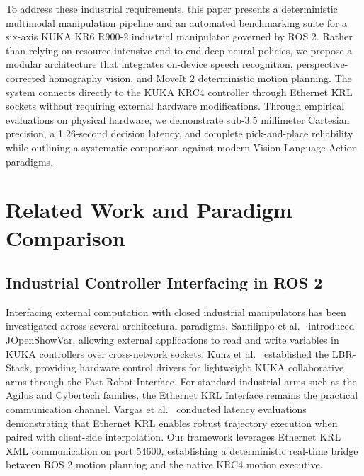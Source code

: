 \documentclass[runningheads]{llncs}
\begin{document}
To address these industrial requirements, this paper presents a deterministic multimodal manipulation pipeline and an automated benchmarking suite for a six-axis KUKA KR6 R900-2 industrial manipulator governed by ROS 2. Rather than relying on resource-intensive end-to-end deep neural policies, we propose a modular architecture that integrates on-device speech recognition, perspective-corrected homography vision, and MoveIt 2 deterministic motion planning. The system connects directly to the KUKA KRC4 controller through Ethernet KRL sockets without requiring external hardware modifications. Through empirical evaluations on physical hardware, we demonstrate sub-3.5 millimeter Cartesian precision, a 1.26-second decision latency, and complete pick-and-place reliability while outlining a systematic comparison against modern Vision-Language-Action paradigms.

\section{Related Work and Paradigm Comparison}
\label{sec:related_work}

\subsection{Industrial Controller Interfacing in ROS 2}
Interfacing external computation with closed industrial manipulators has been investigated across several architectural paradigms. Sanfilippo et al.~\cite{jopenshowvar2015} introduced JOpenShowVar, allowing external applications to read and write variables in KUKA controllers over cross-network sockets. Kunz et al.~\cite{lbr_stack2024} established the LBR-Stack, providing hardware control drivers for lightweight KUKA collaborative arms through the Fast Robot Interface. For standard industrial arms such as the Agilus and Cybertech families, the Ethernet KRL Interface remains the practical communication channel. Vargas et al.~\cite{kuka_eki_eval2022} conducted latency evaluations demonstrating that Ethernet KRL enables robust trajectory execution when paired with client-side interpolation. Our framework leverages Ethernet KRL XML communication on port 54600, establishing a deterministic real-time bridge between ROS 2 motion planning and the native KRC4 motion executive.
\end{document}
